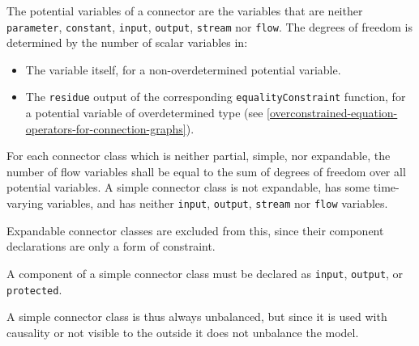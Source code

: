 The potential variables of a connector are the variables that are neither \lstinline!parameter!, \lstinline!constant!, \lstinline!input!, \lstinline!output!, \lstinline!stream! nor \lstinline!flow!.
The degrees of freedom is determined by the number of scalar variables in:
\begin{itemize}
\item The variable itself, for a non-overdetermined potential variable.
\item The \lstinline!residue! output of the corresponding \lstinline!equalityConstraint! function, for a potential variable of overdetermined type (see \cref{overconstrained-equation-operators-for-connection-graphs}).
\end{itemize}
For each connector class which is neither partial, simple, nor expandable, the number of flow variables shall be equal to the sum of degrees of freedom over all potential variables.
A simple connector class is not expandable, has some time-varying variables, and has neither \lstinline!input!, \lstinline!output!, \lstinline!stream! nor \lstinline!flow! variables.
\begin{nonnormative}
Expandable connector classes are excluded from this, since their component declarations are only a form of constraint.
\end{nonnormative}
A component of a simple connector class must be declared as \lstinline!input!, \lstinline!output!, or \lstinline!protected!.
\begin{nonnormative}
A simple connector class is thus always unbalanced, but since it is used with causality or not visible to the outside it does not unbalance the model.
\end{nonnormative}

